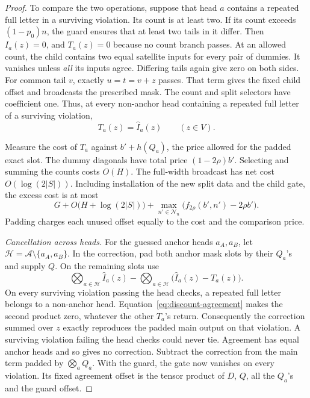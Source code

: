 \begin{proof}
To compare the two operations, suppose that head \(a\) contains a
repeated full letter in a surviving violation. Its count is at least
two. If its count exceeds \((1-p_0)n\), the guard ensures that at
least two tails in it differ. Then \(I_a(z)=0\), and \(T_a(z)=0\)
because no count branch passes. At an allowed count, the child
contains two equal satellite inputs for every pair of dummies. It
vanishes unless \emph{all} its inputs agree. Differing tails again
give zero on both sides. For common tail \(v\), exactly
\(u=t=v+z\) passes. That term gives the fixed child offset and
broadcasts the prescribed mask. The count and split selectors have
coefficient one. Thus, at every non-anchor head containing a repeated full letter
of a surviving violation,
\begin{equation}\label{eq:discount-agreement}
                    T_a(z)=\widehat I_a(z)\qquad(z\in V).
\end{equation}

Measure the cost of \(T_a\) against \(b'+h(Q_a)\), the price allowed
for the padded exact slot. The dummy diagonals have total price
\((1-2\rho)b'\). Selecting and summing the counts costs \(O(H)\).
The full-width broadcast has net cost \(O(\log(2|S|))\).
Including installation of the new split data and the child gate, the
excess cost is at most
\begin{equation}\label{eq:head-cost}
 G+O\big(H+\log(2|S|)\big)
   +\max_{n'\in\mathcal N_n}\big(f_{2\rho}(b',n')-2\rho b'\big).
\end{equation}
Padding charges each unused offset equally to the cost and the
comparison price.

\smallskip\noindent\emph{Cancellation across heads.}
For the guessed anchor heads \(a_A,a_B\), let
\(\mathcal H=\mathcal A\setminus\{a_A,a_B\}\). In the correction,
pad both anchor mask slots by their \(Q_a\)'s and supply \(Q\).
On the remaining slots use
\begin{equation}\label{eq:head-product}
 \bigotimes_{a\in\mathcal H}\widehat I_a(z)
 -
 \bigotimes_{a\in\mathcal H}\big(\widehat I_a(z)-T_a(z)\big).
\end{equation}
On every surviving violation passing the head checks, a repeated
full letter belongs to a non-anchor head. Equation~\eqref{eq:discount-agreement}
makes the second product zero, whatever the other \(T_a\)'s return.
Consequently the correction summed over \(z\) exactly reproduces the
padded main output on that violation. A surviving violation failing the head
checks could never tie. Agreement has equal anchor heads and so gives
no correction. Subtract the correction from the main term padded by
\(\bigotimes_a Q_a\). With the guard, the gate now vanishes on every
violation. Its fixed agreement offset is the tensor product of
\(D\), \(Q\), all the \(Q_a\)'s and the guard offset.


\end{proof}

